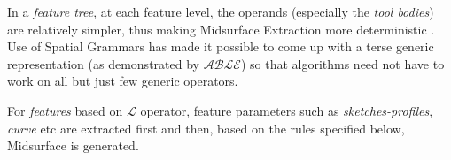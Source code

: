 In a {\em feature tree}, at each feature level, the operands (especially the {\em tool bodies}) are relatively simpler, thus making Midsurface Extraction more deterministic \cite{YogeshIITM2013}.  Use of Spatial Grammars has made it possible to come up with a terse generic representation (as demonstrated by $\mathcal{ABLE}$) so that algorithms need not have to work on all but just few generic operators. 
%
%

For {\em features} based on {\bf $\mathcal{L}$} operator, feature parameters such as {\em sketches-profiles}, {\em curve} etc are extracted first and then, based on the rules specified below, Midsurface is generated.

